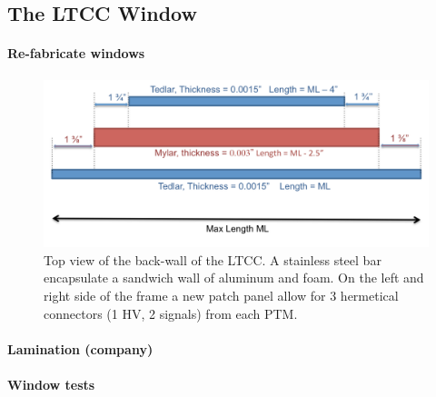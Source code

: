 \subsection{The LTCC Window}


\paragraph{Re-fabricate windows}

\begin{figure}
	\centering
	\includegraphics[width=1.0\columnwidth,keepaspectratio]{img/windowDesign.png}
	\caption{Top view of the back-wall of the LTCC. A stainless steel bar encapsulate a sandwich wall of aluminum and foam. On the left and right side
				 of the frame a new patch panel allow for 3 hermetical connectors (1 HV, 2 signals) from each PTM. }
	\label{fig:windowDesign}
\end{figure}



\paragraph{Lamination (company)}


\paragraph{Window tests}


